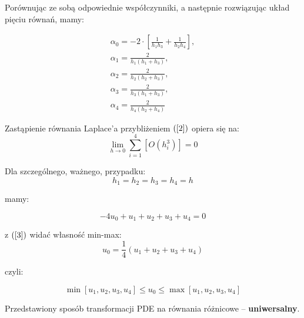\begin{frame}
  Porównując ze sobą odpowiednie współczynniki, a następnie rozwiązując układ pięciu równań, mamy:
  \begin{block}{}
    $$ \begin{array}{l}
    \alpha_0 = -2 \cdot \left[ \frac{1}{h_1 h_3} + \frac{1}{h_2 h_4} \right], \\
    \alpha_1 = \frac{2}{h_1 (h_1 + h_3)}, \\
    \alpha_2 = \frac{2}{h_2 (h_2 + h_3)}, \\
    \alpha_3 = \frac{2}{h_3 (h_1 + h_3)}, \\
    \alpha_4 = \frac{2}{h_4 (h_2 + h_4)}
    \end{array}$$
  \end{block}

  Zastąpienie równania Laplace'a przybliżeniem $(\ref{2})$ opiera się na:
  $$ \lim_{h \rightarrow 0} \sum_{i=1}^4 [O(h_i^3)] = 0$$
\end{frame}

\begin{frame}
  Dla szczególnego, ważnego, przypadku:
  $$ h_1 = h_2 = h_3 = h_4 = h $$

  mamy:

  \begin{equation} \label{3} -4 u_0 + u_1 + u_2 + u_3 + u_4 = 0 \end{equation}

  z $(\ref{3})$ widać własność min-max:
  $$ u_0 = \frac{1}{4} (u_1 + u_2 + u_3 + u_4) $$

  czyli:
  \begin{block}{}
    $$ \min[u_1, u_2, u_3, u_4] \le u_0 \le \max[u_1, u_2, u_3, u_4] $$
  \end{block}

  Przedstawiony sposób transformacji PDE na równania różnicowe -- \textbf{uniwersalny}.
\end{frame}
